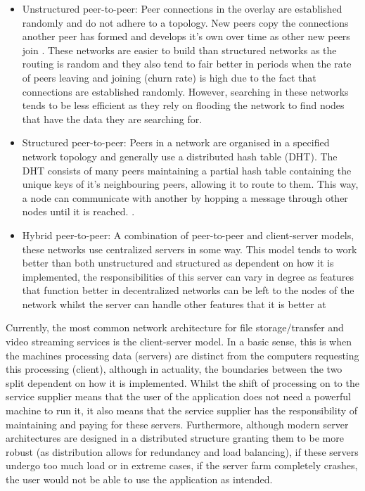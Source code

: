 \documentclass[]{report}
\begin{document}
			\begin{itemize}
				\item Unstructured peer-to-peer:
				Peer connections in the overlay are established randomly and do not adhere to a topology. New peers copy the connections another peer has formed and develops it's own over time as other new peers join  \cite{P2P overlay networks}. These networks are easier to build than structured networks as the routing is random and they also tend to fair better in periods when the rate of peers leaving and joining (churn rate) is high due to the fact that connections are established randomly. However, searching in these networks tends to be less efficient as they rely on flooding the network to find nodes that have the data they are searching for.
				\item Structured peer-to-peer:
				Peers in a network are organised in a specified network topology and generally use a distributed hash table (DHT). The DHT consists of many peers maintaining a partial hash table containing the unique keys of it's neighbouring peers, allowing it to route to them. This way, a node can communicate with another by hopping a message through other nodes until it is reached. \cite{P2P overlay networks}. 
				\item Hybrid peer-to-peer:
				A combination of  peer-to-peer and client-server models, these networks use centralized servers in some way.  This model tends to work better than both unstructured and structured as dependent on how it is implemented, the responsibilities of this server can vary in degree as features that function better in decentralized networks can be left to the nodes of the network whilst the server can handle other features that it is better at \cite{Hybrid P2P network}
			\end{itemize}
						
			Currently, the most common network architecture for file storage/transfer and video streaming services is the client-server model. In a basic sense, this is when the machines processing data (servers) are distinct from the computers requesting this processing (client), although in actuality, the boundaries between the two split dependent on how it is implemented. Whilst the shift of processing on to the service supplier means that the user of the application does not need a powerful machine to run it, it also means that the service supplier has the responsibility of maintaining and paying for these servers. Furthermore, although modern server architectures are designed in a distributed structure granting them to be more robust (as distribution allows for redundancy and load balancing), if these servers undergo too much load or in extreme cases, if the server farm completely crashes, the user would not be able to use the application as intended.
			
\end{document}
